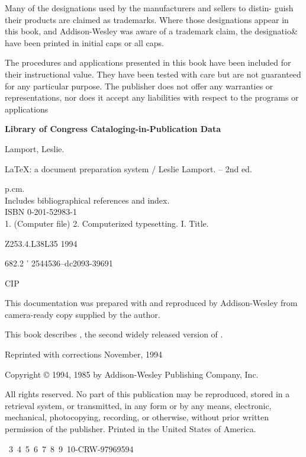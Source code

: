 \thispagestyle{plain}
\begin{center}
\vspace*{8em}
\parbox{0.75\linewidth}{%
\qquad Many of the designations used by the manufacturers and sellers to distin-
guish their products are claimed as trademarks. Where those designations
appear in this book, and Addison-Wesley was aware of a trademark claim,
the designatio\& have been printed in initial caps or all caps.

\bigskip
\qquad The procedures and applications presented in this book have been included
for their instructional value. They have been tested with care but are not
guaranteed for any particular purpose. The publisher does not offer any
warranties or representations, nor does it accept any liabilities with respect
to the programs or applications

\bigskip\bigskip
\textbf{Library of Congress Cataloging-in-Publication Data}

\quad Lamport, Leslie.

\qquad\parbox{1\linewidth}{%
\LaTeX{}: a document preparation system / Leslie Lamport. -- 2nd ed.

\qquad p.\quad cm.\\
Includes bibliographical references and index.\\
ISBN 0-201-52983-1\\
1. (Computer file) 2. Computerized typesetting. I. Title.
}

Z253.4.L38L35 1994

682.2 ' 2544536--dc20\hfill 93-39691

\hfill CIP

This documentation was prepared with \ltx{} and reproduced by Addison-Wesley from 
camera-ready copy supplied by the author.

\bigskip
This book describes \ltxee, the second widely released version of \ltx.

\medskip
Reprinted with corrections November, 1994

\medskip
Copyright \copyright{} 1994, 1985 by Addison-Wesley Publishing Company, Inc.

\medskip
All rights reserved. No part of this publication may be reproduced, stored in
a retrieval system, or transmitted, in any form or by any means, electronic,
mechanical, photocopying, recording, or otherwise, without prior written
permission of the publisher. Printed in the United States of America.

\ 3\ 4\ 5\ 6\ 7\ 8\ 9\ 10-CRW-97969594
}
\end{center}
\restoregeometry
